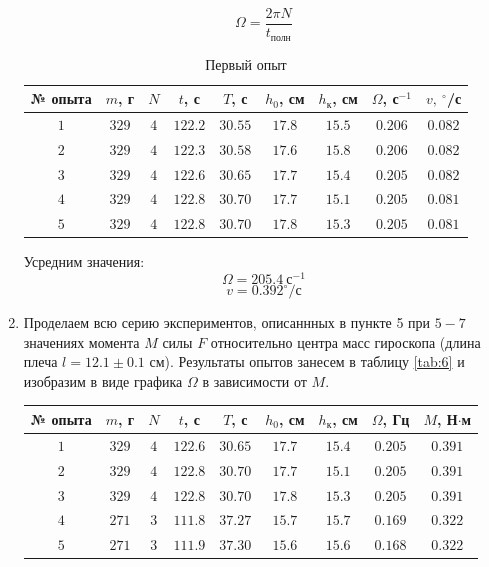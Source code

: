 \documentclass[a4paper,12pt]{article}
\begin{document}
\begin{enumerate}
	$$
		\Omega = \frac{2\pi N}{t_{\text{полн}}}
	$$
	\begin{table}[h]
		\centering
		\begin{tabular}{|c|c|c|c|c|c|c|c|c|} \hline
			№ опыта & $m$, г & $N$ & $t$, с  & $T$, с  & $h_0$, см & $h_{\text{к}}$, см & $\Omega$, с$^{-1}$ & $v,~^{\circ}$/с	  \\ \hline
			$1$ 	& $329$  & $4$ & $122.2$ & $30.55$ & $17.8$    & $15.5$ 			& $0.206$ 			 & $0.082$		  	  \\ \hline
			$2$ 	& $329$  & $4$ & $122.3$ & $30.58$ & $17.6$	   & $15.8$				& $0.206$ 			 & $0.082$		  	  \\ \hline
			$3$ 	& $329$  & $4$ & $122.6$ & $30.65$ & $17.7$    & $15.4$ 			& $0.205$ 			 & $0.082$		  	  \\ \hline
			$4$ 	& $329$  & $4$ & $122.8$ & $30.70$ & $17.7$	   & $15.1$ 			& $0.205$ 			 & $0.081$		  	  \\ \hline
			$5$ 	& $329$  & $4$ & $122.8$ & $30.70$ & $17.8$	   & $15.3$				& $0.205$ 			 & $0.081$		  	  \\ \hline
		\end{tabular}
		\caption{Первый опыт}
		\label{tab:first}
	\end{table}
	Усредним значения:
	$$
	\Omega = 205.4~\text{с$^{-1}$}
	$$
	$$
	v = 0.392^{\circ}/\text{с}
	$$
	\item Проделаем всю серию экспериментов, описаннных в пункте 5 при $5-7$ значениях момента $M$ силы $F$ относительно центра масс гироскопа (длина плеча $l = 12.1\pm 0.1$ см). Результаты опытов занесем в таблицу \ref{tab:6} и изобразим в виде графика $\Omega$ в зависимости от $M$. 
	\begin{table}[h]
		\centering
		\begin{tabular}{|c|c|c|c|c|c|c|c|c|} \hline
			№ опыта & $m$, г & $N$ & $t$, с & $T$, с & $h_0$, см & $h_{\text{к}}$, см & $\Omega$, Гц & $M$, Н$\cdot$м \\ \hline
			$1$ & $329$ & $4$ & $122.6$ & $30.65$ & $17.7$ & $15.4$ & $0.205$ & $0.391$ \\ \hline
			$2$ & $329$ & $4$ & $122.8$ & $30.70$ & $17.7$ & $15.1$ & $0.205$ & $0.391$ \\ \hline
			$3$ & $329$ & $4$ & $122.8$ & $30.70$ & $17.8$ & $15.3$ & $0.205$ & $0.391$ \\ \hline
			$4$ & $271$ & $3$ & $111.8$ & $37.27$ & $15.7$ & $15.7$ & $0.169$ & $0.322$ \\ \hline
			$5$ & $271$ & $3$ & $111.9$ & $37.30$ & $15.6$ & $15.6$ & $0.168$ & $0.322$ \\ \hline

\end{tabular}
\end{table}
\end{enumerate}
\end{document}
